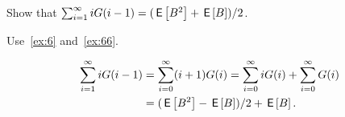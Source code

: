 \begin{exercise}\label{ex:ER}
 Show that $\sum_{i=1}^\infty i G(i-1)= ({\,\mathsf{E}\left[B^2\right] + \,\mathsf{E}\left[B\right]})/{2}$.
\begin{hint}
 Use~\cref{ex:6} and~\cref{ex:66}.
\end{hint}
\begin{solution}
\begin{equation*}
 \begin{split}
 \sum_{i=1}^\infty i G(i-1)
&=\sum_{i=0}^\infty (i+1) G(i)
=\sum_{i=0}^\infty i G(i) +
\sum_{i=0}^\infty G(i)\\
&= (\,\mathsf{E}\left[B^2\right] - \,\mathsf{E}\left[B\right])/2 + \,\mathsf{E}\left[B\right].
 \end{split}
\end{equation*}
\end{solution}
\end{exercise}




